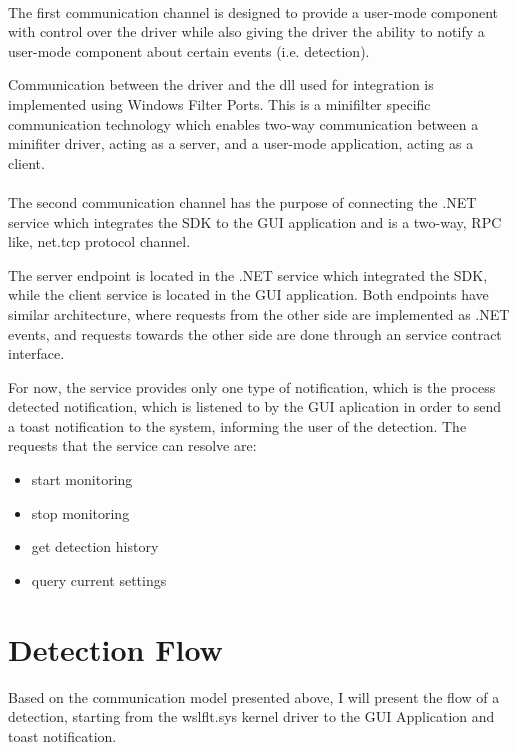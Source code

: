         \paragraph{}
        The first communication channel is designed to provide a user-mode component with control over the driver while also giving the driver
        the ability to notify a user-mode component about certain events (i.e. detection).
        
        Communication between the driver and the dll used for integration is implemented using Windows Filter Ports. This is a minifilter
        specific communication technology which enables two-way communication between a minifiter driver, acting as a server, and a user-mode
        application, acting as a client.

        \paragraph{}
        The second communication channel has the purpose of connecting the .NET service which integrates the SDK to the GUI application and is
        a two-way, RPC like, net.tcp protocol channel.

        The server endpoint is located in the .NET service which integrated the SDK, while the client service is located in the GUI application.
        Both endpoints have similar architecture, where requests from the other side are implemented as .NET events, and requests towards the other
        side are done through an service contract interface.

        For now, the service provides only one type of notification, which is the process detected notification, which is listened to by the GUI
        aplication in order to send a toast notification to the system, informing the user of the detection.
        The requests that the service can resolve are:
        
        \begin{itemize}
            \item start monitoring
            \item stop monitoring
            \item get detection history
            \item query current settings
        \end{itemize}

    \section{Detection Flow}
        Based on the communication model presented above, I will present the flow of a detection, starting from the wslflt.sys kernel driver
        to the GUI Application and toast notification.
        
